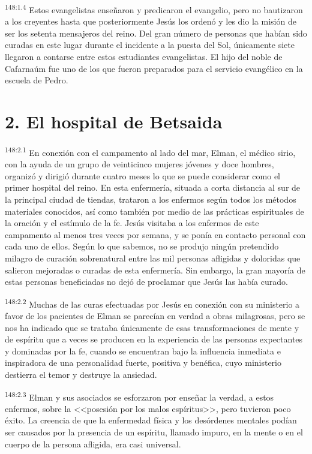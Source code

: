 \par 
\textsuperscript{148:1.4} Estos evangelistas enseñaron y predicaron el evangelio, pero no bautizaron a los creyentes hasta que posteriormente Jesús los ordenó y les dio la misión de ser los setenta mensajeros del reino. Del gran número de personas que habían sido curadas en este lugar durante el incidente a la puesta del Sol, únicamente siete llegaron a contarse entre estos estudiantes evangelistas. El hijo del noble de Cafarnaúm fue uno de los que fueron preparados para el servicio evangélico en la escuela de Pedro.

\section*{2. El hospital de Betsaida}
\par 
\textsuperscript{148:2.1} En conexión con el campamento al lado del mar, Elman, el médico sirio, con la ayuda de un grupo de veinticinco mujeres jóvenes y doce hombres, organizó y dirigió durante cuatro meses lo que se puede considerar como el primer hospital del reino. En esta enfermería, situada a corta distancia al sur de la principal ciudad de tiendas, trataron a los enfermos según todos los métodos materiales conocidos, así como también por medio de las prácticas espirituales de la oración y el estímulo de la fe. Jesús visitaba a los enfermos de este campamento al menos tres veces por semana, y se ponía en contacto personal con cada uno de ellos. Según lo que sabemos, no se produjo ningún pretendido milagro de curación sobrenatural entre las mil personas afligidas y doloridas que salieron mejoradas o curadas de esta enfermería. Sin embargo, la gran mayoría de estas personas beneficiadas no dejó de proclamar que Jesús las había curado.

\par 
\textsuperscript{148:2.2} Muchas de las curas efectuadas por Jesús en conexión con su ministerio a favor de los pacientes de Elman se parecían en verdad a obras milagrosas, pero se nos ha indicado que se trataba únicamente de esas transformaciones de mente y de espíritu que a veces se producen en la experiencia de las personas expectantes y dominadas por la fe, cuando se encuentran bajo la influencia inmediata e inspiradora de una personalidad fuerte, positiva y benéfica, cuyo ministerio destierra el temor y destruye la ansiedad.

\par 
\textsuperscript{148:2.3} Elman y sus asociados se esforzaron por enseñar la verdad, a estos enfermos, sobre la <<posesión por los malos espíritus>>, pero tuvieron poco éxito. La creencia de que la enfermedad física y los desórdenes mentales podían ser causados por la presencia de un espíritu, llamado impuro, en la mente o en el cuerpo de la persona afligida, era casi universal.

